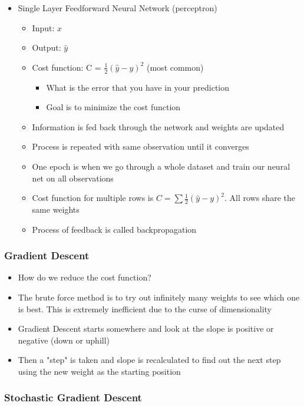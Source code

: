 \documentclass[11pt]{article}
\begin{document}
\begin{itemize}
\item Single Layer Feedforward Neural Network (perceptron)
\begin{itemize}
\item Input: \(x\)
\item Output:  \(\hat{y}\)
\item Cost function: C = \(\frac {1}{2}(\hat{y}-y)^2\) (most common)
\begin{itemize}
\item What is the error that you have in your prediction
\item Goal is to minimize the cost function
\end{itemize}
\item Information is fed back through the network and weights are updated
\item Process is repeated with same observation until it converges
\item One epoch is when we go through a whole dataset and train our neural net on all observations
\item Cost function for multiple rows is \(C=\sum\frac{1}{2}(\hat{y} - y) ^ 2\). All rows share the same weights
\item Process of feedback is called backpropagation
\end{itemize}
\end{itemize}

\subsubsection{Gradient Descent}
\label{sec:org03c600c}

\begin{itemize}
\item How do we reduce the cost function?
\item The brute force method is to try out infinitely many weights to see which one is best. This is extremely inefficient due to the curse of dimensionality
\item Gradient Descent starts somewhere and look at the slope is positive or negative (down or uphill)
\item Then a "step" is taken and slope is recalculated to find out the next step using the new weight as the starting position
\end{itemize}

\subsubsection{Stochastic Gradient Descent}
\label{sec:org7b237e5}
\end{document}
